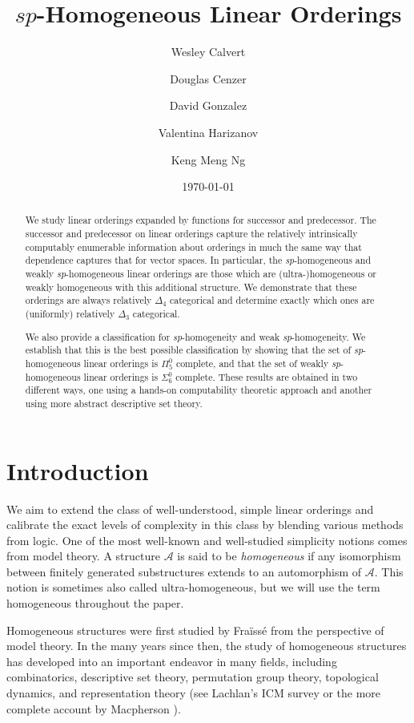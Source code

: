 \documentclass[11pt]{amsart}
\title[Homogeneous Linear Orderings]{$sp$-Homogeneous Linear Orderings}
\author[Calvert]{Wesley Calvert}
\author[Cenzer]{Douglas Cenzer}
\author[Gonzalez]{David Gonzalez}
\author[Harizanov]{Valentina Harizanov}
\author[Ng]{Keng Meng Ng}
\date{\today}
\theoremstyle{definition}
\def\A{\mathcal A}
\begin{document}
\begin{abstract} We study linear orderings expanded by functions for successor and predecessor. The successor and predecessor on linear orderings capture the relatively intrinsically computably enumerable information about orderings in much the same way that dependence captures that for vector spaces. In particular, the \textit{sp}-homogeneous and weakly \textit{sp}-homogeneous linear orderings are those which are (ultra-)homogeneous or weakly homogeneous with this additional structure.
 We demonstrate that these orderings are always relatively $\Delta_4$ categorical and determine exactly which ones are (uniformly) relatively $\Delta_3$ categorical.
 

    We also provide a classification for \textit{sp}-homogeneity and weak \textit{sp}-homogeneity.
    We establish that this is the best possible classification by showing that the set of \textit{sp}-homogeneous linear orderings is $\Pi_5^0$ complete, and that the set of weakly \textit{sp}-homogeneous linear orderings is $\Sigma_6^0$ complete.
    These results are obtained in two different ways, one using a hands-on computability theoretic approach and another using more abstract descriptive set theory.
\end{abstract}


\maketitle

\section{Introduction}

We aim to extend the class of well-understood, simple linear orderings and calibrate the exact levels of complexity in this class by blending various methods from logic.
One of the most well-known and well-studied simplicity notions comes from model theory.
A structure $\A$ is said to be \emph{homogeneous} if any isomorphism
between finitely generated substructures extends to an automorphism
of $\A$.
This notion is sometimes also called ultra-homogeneous, but we will use the term homogeneous throughout the paper.

Homogeneous structures were first studied
by Fra\"{i}ss\'{e} \cite{Fr86} from the perspective of model theory.
In the many years since then, the study of homogeneous structures has developed into an important endeavor in many fields, including combinatorics, descriptive set theory, permutation group theory, topological dynamics, and representation theory (see Lachlan's ICM survey \cite{L87} or the more complete account by Macpherson \cite{Mac11}).  %
\end{document}
